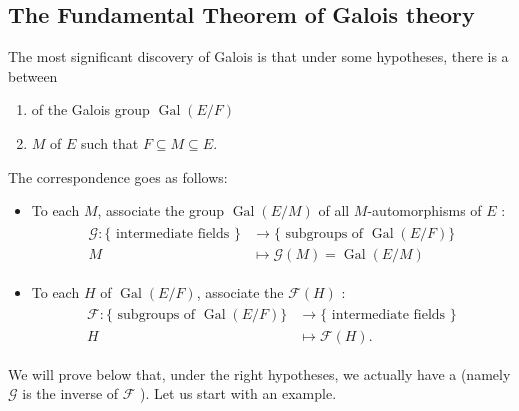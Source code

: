 \documentclass{article}
\begin{document}
\subsection{The Fundamental Theorem of Galois theory}
The most significant discovery of Galois is that  under some hypotheses, there is a  between
\begin{enumerate}
    \item {} of the Galois group $\operatorname{Gal}(E / F)$
    \item {} $M$ of $E$ such that $F \subseteq M \subseteq E$.
\end{enumerate}
The correspondence goes as follows:
\begin{itemize}
    \item To each  $M$, associate the group $\operatorname{Gal}(E / M)$ of all $M$-automorphisms of $E$ :
\begin{align*}
\begin{aligned}
\mathcal{G} : \{\text { intermediate fields }\} & \rightarrow\{\text { subgroups of } \operatorname{Gal}(E / F)\} \\
M & \mapsto \mathcal{G}(M)=\operatorname{Gal}(E / M)
\end{aligned}
\end{align*}
\item To each  $H$ of $\operatorname{Gal}(E / F)$, associate the  $\mathcal{F}(H)$ :
\begin{align*}
\begin{aligned}
\mathcal{F}:\{\text { subgroups of } \operatorname{Gal}(E / F)\} & \rightarrow\{\text { intermediate fields }\} \\
H & \mapsto \mathcal{F}(H) .
\end{aligned}
\end{align*}
\end{itemize}


We will prove below that, under the right hypotheses, we actually have a  (namely $\mathcal{G}$ is the inverse of $\mathcal{F}$ ). Let us start with an example.
\end{document}
